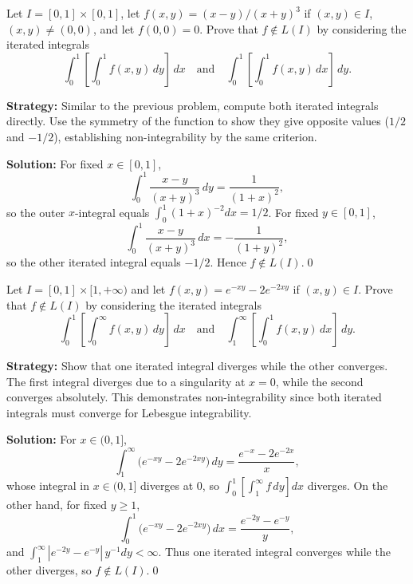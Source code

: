 \begin{problembox}
Let \( I = [0, 1] \times [0, 1] \), let \( f(x, y) = (x - y)/(x + y)^3 \) if \( (x, y) \in I \), \( (x, y) \neq (0, 0) \), and let \( f(0, 0) = 0 \). Prove that \( f \notin L(I) \) by considering the iterated integrals
\[
\int_0^1 \left[ \int_0^1 f(x, y) \, dy \right] \, dx \quad \text{and} \quad \int_0^1 \left[ \int_0^1 f(x, y) \, dx \right] \, dy.
\]
\end{problembox}

\noindent\textbf{Strategy:} Similar to the previous problem, compute both iterated integrals directly. Use the symmetry of the function to show they give opposite values (\(1/2\) and \(-1/2\)), establishing non-integrability by the same criterion.

\bigskip\noindent\textbf{Solution:}
For fixed \(x\in[0,1]\),
\[
\int_0^1 \frac{x-y}{(x+y)^3}\,dy = \frac{1}{(1+x)^{2}},
\]
so the outer \(x\)-integral equals \(\int_0^1 (1+x)^{-2}dx=1/2\). For fixed \(y\in[0,1]\),
\[
\int_0^1 \frac{x-y}{(x+y)^3}\,dx = -\frac{1}{(1+y)^{2}},
\]
so the other iterated integral equals \(-1/2\). Hence \(f\notin L(I)\).\qed


\begin{problembox}
Let \( I = [0, 1] \times [1, +\infty) \) and let \( f(x, y) = e^{-xy} - 2e^{-2xy} \) if \( (x, y) \in I \). Prove that \( f \notin L(I) \) by considering the iterated integrals
\[
\int_0^1 \left[ \int_0^\infty f(x, y) \, dy \right] \, dx \quad \text{and} \quad \int_1^\infty \left[ \int_0^1 f(x, y) \, dx \right] \, dy.
\]
\end{problembox}

\noindent\textbf{Strategy:} Show that one iterated integral diverges while the other converges. The first integral diverges due to a singularity at \(x=0\), while the second converges absolutely. This demonstrates non-integrability since both iterated integrals must converge for Lebesgue integrability.

\bigskip\noindent\textbf{Solution:}
For \(x\in(0,1]\),
\[
\int_1^{\infty} \big(e^{-xy}-2e^{-2xy}\big)\,dy = \frac{e^{-x}-2e^{-2x}}{x},
\]
whose integral in \(x\in(0,1]\) diverges at 0, so \(\int_0^1[\int_1^{\infty} f\,dy]dx\) diverges. On the other hand, for fixed \(y\ge 1\),
\[
\int_0^1 \big(e^{-xy}-2e^{-2xy}\big)\,dx = \frac{e^{-2y}-e^{-y}}{y},
\]
and \(\int_1^{\infty} |e^{-2y}-e^{-y}|\,y^{-1} dy<\infty\). Thus one iterated integral converges while the other diverges, so \(f\notin L(I)\).\qed
